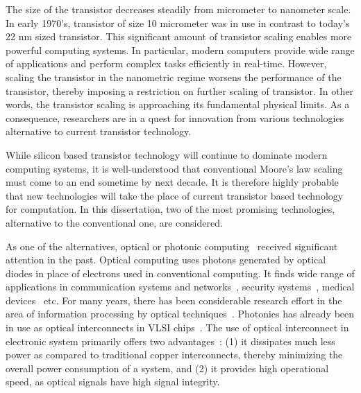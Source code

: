 \documentclass[10pt,letterpaper,twoside,openright]{book}
\begin{document}
The size of the transistor decreases steadily from micrometer to nanometer scale. In early 1970's, transistor of size 10 micrometer was in use in contrast to today's 22 nm sized transistor. This significant amount of transistor scaling enables more powerful computing systems. In particular, modern computers provide wide range of applications and perform complex tasks efficiently in real-time. However, scaling the transistor in the nanometric regime worsens the performance of the transistor, thereby imposing a restriction on further scaling of transistor. In other words, the transistor scaling is approaching its fundamental physical limits. As a consequence, researchers are in a quest for innovation from various technologies alternative to current transistor technology.

While silicon based transistor technology will continue to dominate modern computing systems, it is well-understood that conventional Moore's law scaling must come to an end sometime by next decade. It is therefore highly probable that new technologies will take the place of current transistor based technology for computation. In this dissertation, two of the most promising technologies, alternative to the conventional one, are considered.

As one of the alternatives, optical or photonic computing~\cite{Keyes:1985} received significant attention in the past. Optical computing uses photons generated by optical diodes in place of electrons used in conventional computing. It finds wide range of applications in communication systems and networks~\cite{Keiser:1991}, security systems~\cite{Chen:14}, medical devices~\cite{fitch2003medical,dosmann1996medical} etc. For many years, there has been considerable research effort in the area of information processing by optical techniques~\cite{SHLee1981,IIM1986}. Photonics has already been in use as optical interconnects in VLSI chips~\cite{Krish2013}. The use of optical interconnect in electronic system primarily offers two advantages~\cite{OG1992,Feldman:88}: (1) it dissipates much less power as compared to traditional copper interconnects, thereby minimizing the overall power consumption of a system, and (2) it provides high operational speed, as optical signals have high signal integrity. 
\end{document}
